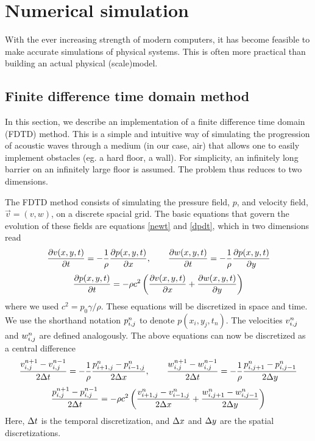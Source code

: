 \section{Numerical simulation}
With the ever increasing strength of modern computers, it has become feasible to make accurate simulations of physical systems. This is often more practical than building an actual physical (scale)model.


\subsection{Finite difference time domain method}
In this section, we describe an implementation of a finite difference time domain (FDTD) method. This is a simple and intuitive way of simulating the progression of acoustic waves through a medium (in our case, air) that allows one to easily implement obstacles (eg. a hard floor, a wall). For simplicity, an infinitely long barrier on an infinitely large floor is assumed. The problem thus reduces to two dimensions.

The FDTD method consists of simulating the pressure field, $p$, and velocity field, $\vec{v} = (v, w)$,  on a discrete spacial grid. The basic equations that govern the evolution of these fields are equations \ref{newt} and \ref{dpdt}, which in two dimensions read
$$
\frac{\partial v(x,y,t)}{\partial t} = -\frac{1}{\rho} \frac{\partial p(x,y,t)}{\partial x}
, \qquad
\frac{\partial w(x,y,t)}{\partial t} = -\frac{1}{\rho} \frac{\partial p(x,y,t)}{\partial y}
$$
$$
\frac{\partial p(x,y,t)}{\partial t} = -\rho c^2 \left(\frac{\partial v(x,y,t)}{\partial x} + \frac{\partial w(x,y,t)}{\partial y}\right)
$$
where we used $c^2 = p_0 \gamma / \rho$. These equations will be discretized in space and time. We use the shorthand notation $p_{i,j}^n$ to denote $p(x_i, y_j, t_n)$. The velocities $v_{i,j}^n$ and $w_{i,j}^n$ are defined analogously. The above equations can now be discretized as a central difference
$$
\frac{v_{i,j}^{n+1} - v_{i,j}^{n-1}}{2\Delta t} = -\frac{1}{\rho} \frac{p^n_{i+1,j} - p^n_{i-1,j}}{2\Delta x}
, \qquad
\frac{w_{i,j}^{n+1} - w_{i,j}^{n-1}}{2\Delta t} = -\frac{1}{\rho} \frac{p^n_{i,j+1} - p^n_{i,j-1}}{2\Delta y}
$$
$$
\frac{p_{i,j}^{n+1} - p_{i,j}^{n-1}}{2\Delta t} = 
	-\rho c^2 \left(
		\frac{v^n_{i+1,j} - v^n_{i-1,j}}{2\Delta x}
		+ \frac{w^n_{i,j+1} - w^n_{i,j-1}}{2\Delta y}
	\right)
$$
Here, $\Delta t$ is the temporal discretization, and $\Delta x$ and $\Delta y$ are the spatial discretizations.

